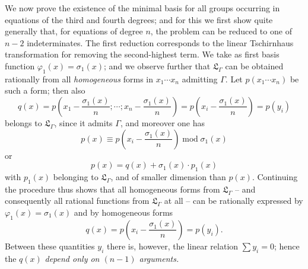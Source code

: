\documentclass[11pt]{article}
\begin{document}
We now prove the existence of the minimal basis for all groups occurring in equations of the third and fourth degrees; and for this we first show quite generally that, for equations of degree $n$, the problem can be reduced to one of $n-2$ indeterminates. The first reduction corresponds to the linear Tschirnhaus transformation for removing the second-highest term. We take as first basis function $\varphi_1(x)=\sigma_1(x)$; and we observe further that $\mathfrak L_\Gamma$ can be obtained rationally from all \emph{homogeneous} forms in $x_1\cdots x_n$ admitting $\Gamma$. Let $p(x_1\cdots x_n)$ be such a form; then also
\[
q(x)=p\left(x_1-\frac{\sigma_1(x)}{n};\cdots;x_n-\frac{\sigma_1(x)}{n}\right)=p\left(x_i-\frac{\sigma_1(x)}{n}\right)=p(y_i)
\]
belongs to $\mathfrak L_\Gamma$, since it admits $\Gamma$, and moreover one has
\[
p(x)\equiv p\left(x_i-\frac{\sigma_1(x)}{n}\right)\operatorname{mod}\sigma_1(x)
\]
or
\[
p(x)=q(x)+\sigma_1(x)\cdot p_1(x)
\]
with $p_1(x)$ belonging to $\mathfrak L_\Gamma$, and of smaller dimension than $p(x)$. Continuing the procedure thus shows that all homogeneous forms from $\mathfrak L_\Gamma$ -- and consequently all rational functions from $\mathfrak L_\Gamma$ at all -- can be rationally expressed by $\varphi_1(x)=\sigma_1(x)$ and by homogeneous forms
\[
q(x)=p\left(x_i-\frac{\sigma_1(x)}{n}\right)=p(y_i).
\]
Between these quantities $y_i$ there is, however, the linear relation $\sum y_i=0$; hence the $q(x)$ \emph{depend only on $(n-1)$ arguments.}
\end{document}
